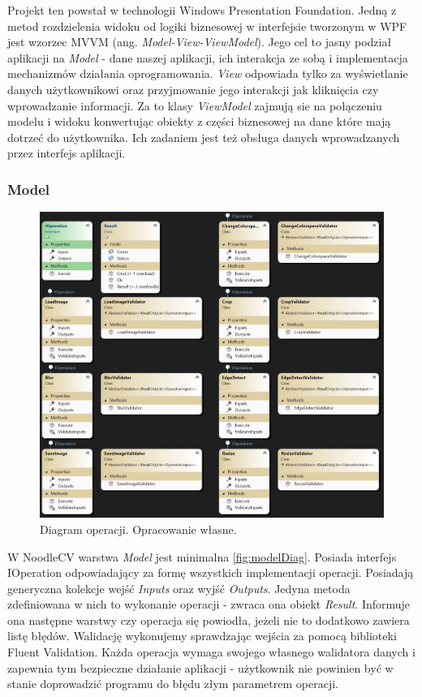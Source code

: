 
Projekt ten powstał w technologii Windows Presentation Foundation. 
Jedną z metod rozdzielenia widoku od logiki biznesowej w interfejsie tworzonym w WPF jest wzorzec MVVM (ang. \textit{Model-View-ViewModel}). 
Jego cel to jasny podział aplikacji na \textit{Model} - dane naszej aplikacji, ich interakcja ze sobą i implementacja mechanizmów działania oprogramowania. 
\textit{View} odpowiada tylko za wyświetlanie danych użytkownikowi oraz przyjmowanie jego interakcji jak kliknięcia czy wprowadzanie informacji. 
Za to klasy \textit{ViewModel} zajmują sie na połączeniu modelu i widoku konwertując obiekty z części biznesowej na dane które mają dotrzeć do użytkownika. 
Ich zadaniem jest też obsługa danych wprowadzanych przez interfejs aplikacji.

\subsubsection{Model}

\begin{figure}[H]
    \centering
    \includegraphics[width=1\linewidth]{images/Picture11.jpg}
    \caption{Diagram operacji. Opracowanie własne.}
    \label{fig:modelDiag}
\end{figure}

W NoodleCV warstwa \textit{Model} jest minimalna \autoref{fig:modelDiag}. 
Posiada interfejs IOperation odpowiadający za formę wszystkich implementacji operacji. 
Posiadają generyczna kolekcje wejść \textit{Inputs} oraz wyjść \textit{Outputs}.
Jedyna metoda zdefiniowana w nich to wykonanie operacji - zwraca ona obiekt \textit{Result}.
Informuje ona następne warstwy czy operacja się powiodła, jeżeli nie to dodatkowo zawiera listę błędów. 
Walidację wykonujemy sprawdzając wejścia za pomocą biblioteki Fluent Validation. 
Każda operacja wymaga swojego własnego walidatora danych i zapewnia tym bezpieczne działanie aplikacji - użytkownik nie powinien być w stanie doprowadzić programu do błędu złym parametrem operacji.

